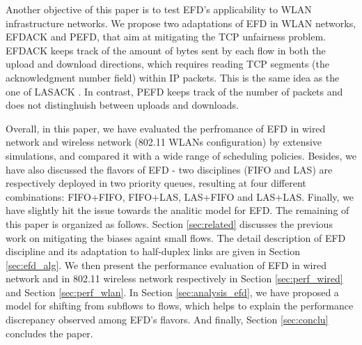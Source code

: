 \documentclass[preprint,12pt]{elsarticle}
\begin{document}
Another objective of this paper is to test EFD's applicability to WLAN infrastructure networks. We propose two adaptations of EFD in WLAN networks, EFDACK and PEFD,  that aim at mitigating the TCP unfairness problem. EFDACK keeps  track of the amount of bytes sent by each flow in both the upload and download directions, which requires reading TCP segments (the acknowledgment number field) within IP packets. This is the same idea as the one of LASACK \cite{Keller2008Improving}. In contrast, PEFD keeps track of the number of packets and does not distinghuish between uploads and downloads. 

Overall, in this paper, we have evaluated the perfromance of EFD in wired network and wireless network (802.11 WLANs configuration) by extensive simulations, and compared it with a wide range of scheduling policies. Besides, we have also discussed the flavors of EFD - two disciplines (FIFO and LAS) are respectively deployed in two priority queues, resulting at four different combinations: FIFO+FIFO, FIFO+LAS, LAS+FIFO and LAS+LAS. Finally, we have slightly hit the issue towards the analitic model for EFD. The remaining of this paper is organized as follows. Section \ref{sec:related} discusses the previous work on mitigating the biases againt small flows. The detail description of EFD discipline and its adaptation to half-duplex links are given in Section \ref{sec:efd_alg}. We then present the performance evaluation of EFD in wired network and in 802.11 wireless network respectively in Section \ref{sec:perf_wired} and Section \ref{sec:perf_wlan}. In Section \ref{sec:analysis_efd}, we have proposed a model for shifting from subflows to flows, which helps to explain the performance discrepancy observed among EFD's flavors. And finally, Section \ref{sec:conclu} concludes the paper.  
\end{document}
